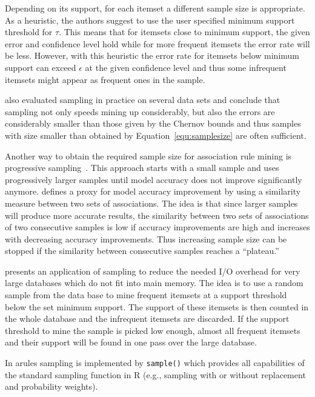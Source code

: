 \documentclass[10pt,a4paper]{article}
\newcommand{\strong}[1]{{\normalfont\fontseries{b}\selectfont #1}}
\newcommand{\func}[1]{\mbox{\texttt{#1()}}}
\newcommand{\pkg}[1]{\strong{#1}}
\newcommand{\proglang}[1]{\textsf{#1}}
\begin{document}
Depending on its support, for each itemset a different sample size is
appropriate.  As a heuristic, the authors suggest to use the user
specified minimum support threshold for $\tau$.  This means that for
itemsets close to minimum support, the given error and confidence level
hold while for more frequent itemsets the error rate will be less.
However, with this heuristic the error rate for itemsets below minimum
support can exceed $\epsilon$ at the given confidence level and thus
some infrequent itemsets might appear as frequent ones in the sample.

\cite{arules:Zaki+Parthasarathy+Li+Ogihara:1997} also evaluated sampling
in practice on several data sets and conclude that sampling not only
speeds mining up considerably, but also the errors are considerably
smaller than those given by the Chernov bounds and thus samples with
size smaller than obtained by Equation~\ref{equ:samplesize} are often
sufficient.

Another way to obtain the required sample size 
for association rule mining is progressive 
sampling~\citep{arules:Parthasarathy:2002}.
This approach starts with a small sample and uses progressively larger 
samples until model accuracy does not improve significantly anymore. 
\cite{arules:Parthasarathy:2002} defines a proxy for 
model accuracy improvement by using a similarity measure between two
sets of associations. The idea is that 
since larger samples will produce more accurate results, the
similarity between two sets of associations of two consecutive samples
is low if accuracy improvements are high and increases with
decreasing accuracy improvements.
Thus increasing sample size can be stopped if the similarity
between consecutive samples reaches a ``plateau.'' 

\cite{arules:Toivonen:1996} presents an application of sampling to reduce
the needed I/O overhead for very large databases which do not fit into 
main memory.
The idea is to use a random sample from the data base to mine
frequent itemsets at a support threshold below the set minimum support.
The support of these itemsets is then counted in the whole database 
and the infrequent itemsets are discarded. 
If the support threshold to mine the sample is picked low enough, 
almost all frequent itemsets and their support will be found
in one pass over the large database.

In \pkg{arules} sampling is implemented by \func{sample}
which provides all capabilities of the standard sampling function 
in \proglang{R}
(e.g., sampling with or without replacement and probability weights).
\end{document}
